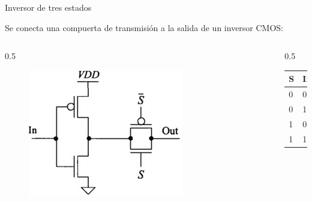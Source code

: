 \documentclass[aspectratio=169,t]{beamer}
\begin{document}
\begin{frame}{Inversor de tres estados}

Se conecta una compuerta de transmisión a la salida de un inversor CMOS:

\begin{columns}

\begin{column}{0.5\textwidth}

\begin{figure}
    \centering
    \includegraphics[width=0.7\textwidth]{figuras/three_state_inverter.png}
\end{figure}

\end{column}

\begin{column}{0.5\textwidth}

\begin{table}[H]
    \centering
    \begin{tabular}{|p{1cm}|p{1cm}|p{1cm}|}
        \hline \textbf{S}  & \textbf{In}   & \textbf{Out}  \\
        \hline 0           & 0             & Z             \\
        \hline 0           & 1             & Z             \\
        \hline 1           & 0             & 1             \\
        \hline 1           & 1             & 0             \\
        \hline 
    \end{tabular}
\end{table}

\end{column}

\end{columns}

\end{frame}
\end{document}
